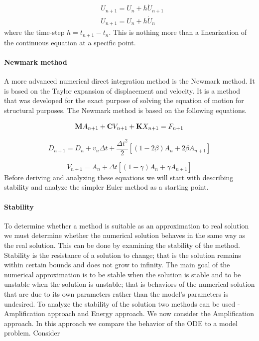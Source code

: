 \documentclass{article}
\begin{document}
				\begin{align}
					&U_{n+1} = U_n + h\dot{U}_{n+1}\\
					&U_{n+1} = U_n + h\dot{U}_{n}
				\end{align}
where the time-step $h = t_{n+1}-t_n$. This is nothing more than a linearization of the continuous equation at a specific point.


			\paragraph{Newmark method} A more advanced numerical direct integration method is the Newmark method. It is based on the Taylor expansion of displacement and velocity. It is a method that was developed for the exact purpose of solving the equation of motion for structural purposes. The Newmark method is based on the following equations.

				\begin{equation}
					\\
					\textbf{M}A_{n+1}+\textbf{C}V_{n+1}+\textbf{K}X_{n+1} =F_{n+1}
					\\
				\end{equation}

				\begin{equation}		
					D_{n+1} = D_{n}+v_{n}\Delta t+\frac{{\Delta t}^{2}}{2}[(1-2\beta)A_n + 2\beta A_{n+1}]
				\end{equation}

				\begin{equation}
					V_{n+1} = A_{n}+\Delta t[(1-\gamma)A_n + \gamma A_{n+1}]
				\end{equation}
Before deriving and analyzing these equations we will start with describing stability and analyze the simpler Euler method as a starting point. 

		
			\paragraph{Stability} To determine whether a method is suitable as an approximation to real solution we must determine whether the numerical solution behaves in the same way as the real solution. This can be done by examining the stability of the method. Stability is the resistance of a solution to change; that is the solution remains within certain bounds and does not grow to infinity. The main goal of the numerical approximation is to be stable when the solution is stable and to be unstable when the solution is unstable; that is behaviors of the numerical solution that are due to its own parameters rather than the model's parameters is undesired. To analyze the stability of the solution two methods can be used - Amplification approach and Energy approach. We now consider the Amplification approach. In this approach we compare the behavior of the ODE to a model problem. Consider
\end{document}
